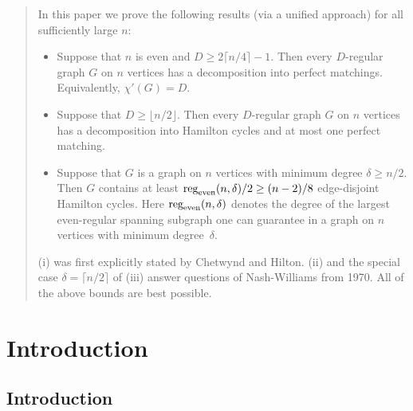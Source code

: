 \documentclass{memo-l}
\numberwithin{section}{chapter}
\numberwithin{equation}{section}
\numberwithin{firstthm}{section}
\numberwithin{figure}{section}
\begin{document}
\begin{abstract}
In this paper we prove the following results (via a unified approach) for all sufficiently large $n$:
\begin{itemize}
\item[(i)] [\emph{$1$-factorization conjecture}]
Suppose  that $n$ is even and $D\geq 2\lceil n/4\rceil -1$. 
Then every $D$-regular graph $G$ on $n$ vertices has a decomposition into perfect matchings.
Equivalently, $\chi'(G)=D$.

\item[(ii)] [\emph{Hamilton decomposition conjecture}]
Suppose that $D \ge   \lfloor n/2 \rfloor $.
Then every $D$-regular graph $G$ on $n$ vertices has a decomposition
into Hamilton cycles and at most one perfect matching.

\item[(iii)] [\emph{Optimal packings of Hamilton cycles}] Suppose that $G$ is a graph on $n$ vertices with
minimum degree $\delta\ge n/2$.
Then $G$ contains at least ${\rm reg}_{\rm even}(n,\delta)/2 \ge (n-2)/8$ edge-disjoint Hamilton cycles.
Here $\textnormal{reg}_{\textnormal{even}}(n,\delta)$ denotes the degree of the 
largest even-regular spanning subgraph one can guarantee in a graph on $n$ vertices
with minimum degree~$\delta$.
\end{itemize}
(i) was first  explicitly stated by Chetwynd and Hilton.
(ii) and the special case $\delta= \lceil n/2 \rceil$ of (iii) answer questions of Nash-Williams from 1970.
All of the above bounds are best possible. 
\end{abstract}

\maketitle

\tableofcontents

% 

\mainmatter



\chapter{Introduction}

\section{Introduction}\label{intro}
\end{document}

